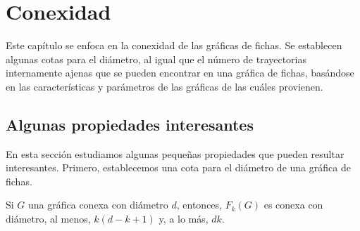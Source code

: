 \chapter{Conexidad}%
\label{cap:conexidad}

Este cap\'itulo se enfoca en la conexidad de las gr\'aficas de fichas. Se
establecen algunas cotas para el di\'ametro, al igual que el n\'umero de
trayectorias internamente ajenas que se pueden encontrar en una gr\'afica de
fichas, bas\'andose en las caracter\'isticas y par\'ametros de las gr\'aficas de
las cu\'ales provienen.

\section{Algunas propiedades interesantes}%
\label{sec:etiquetas}

En esta secci\'on estudiamos algunas peque\~{n}as propiedades que pueden
resultar interesantes. Primero, establecemos una cota para el di\'ametro de una
gr\'afica de fichas.

\begin{teorema}%
\label{teo:diamFG}
    Si $G$ una gr\'afica conexa con di\'ametro $d$, entonces, $F_{k}(G)$ es
    conexa con di\'ametro, al menos, $k(d -k+1)$ y, a lo m\'as, $d k$.
\end{teorema}


